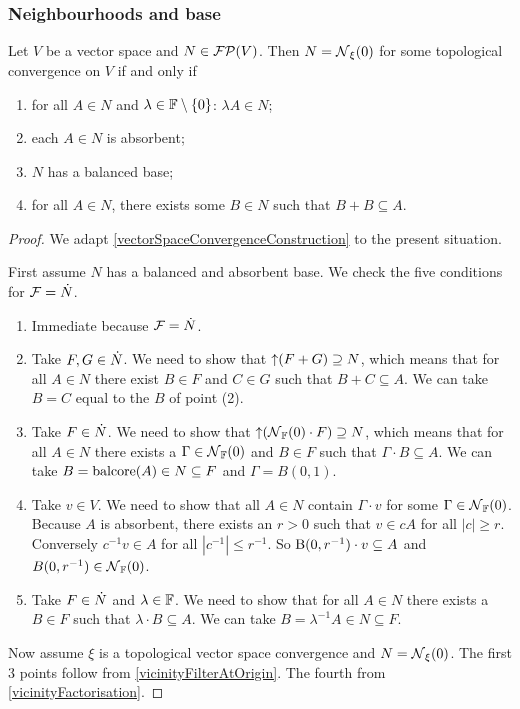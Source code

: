 \subsubsection{Neighbourhoods and base}
\begin{proposition} \label{TVSconstruction}
Let $V$ be a vector space and $N\in\operatorname{\mathcal{FP}}(V)$. Then $N = \operatorname{\mathcal{N}}_\xi(0)$ for some topological convergence on $V$ \textup{if and only if}
\begin{enumerate}
\item for all $A\in N$ and $\lambda\in \mathbb{F}\setminus\{0\}$: $\lambda A\in N$;
\item each $A \in N$ is absorbent;
\item $N$ has a balanced base;
\item for all $A\in N$, there exists some $B\in N$ such that $B+B\subseteq A$.
\end{enumerate}
\end{proposition}
\begin{proof}
We adapt \ref{vectorSpaceConvergenceConstruction} to the present situation.

First assume $N$ has a balanced and absorbent base. We check the five conditions for $\mathcal{F} = \dot{N}$.

\begin{enumerate}
\item Immediate because $\mathcal{F} = \dot{N}$.
\item Take $F,G\in \dot{N}$. We need to show that $\operatorname{\uparrow} (F + G) \supseteq N$, which means that for all $A \in N$ there exist $B\in F$ and $C\in G$ such that $B+C\subseteq A$. We can take $B = C$ equal to the $B$ of point (2).
\item Take $F\in \dot{N}$. We need to show that $\operatorname{\uparrow}(\operatorname{\mathcal{N}}_{\mathbb{F}}(0)\cdot F) \supseteq N$, which means that for all $A\in N$ there exists a $\Gamma\in \operatorname{\mathcal{N}}_{\mathbb{F}}(0)$ and $B\in F$ such that $\Gamma \cdot B\subseteq A$. We can take $B = \operatorname{balcore}(A) \in N \subseteq F$ and $\Gamma = B(0,1)$.
\item Take $v\in V$. We need to show that all $A\in N$ contain $\Gamma\cdot v$ for some $\Gamma \in \operatorname{\mathcal{N}}_{\mathbb{F}}(0)$. Because $A$ is absorbent, there exists an $r>0$ such that $v\in cA$ for all $|c|\geq r$. Conversely $c^{-1}v \in A$ for all $|c^{-1}| \leq r^{-1}$. So $\operatorname{B}(0,r^{-1})\cdot v \subseteq A$ and $B(0,r^{-1}) \in \operatorname{\mathcal{N}}_{\mathbb{F}}(0)$.
\item Take $F\in \dot{N}$ and $\lambda\in \mathbb{F}$. We need to show that for all $A\in N$ there exists a $B\in F$ such that $\lambda\cdot B\subseteq A$. We can take $B = \lambda^{-1}A \in N\subseteq F$.
\end{enumerate}

Now assume $\xi$ is a topological vector space convergence and $N = \operatorname{\mathcal{N}}_\xi(0)$. The first 3 points follow from \ref{vicinityFilterAtOrigin}. The fourth from \ref{vicinityFactorisation}.
\end{proof}


